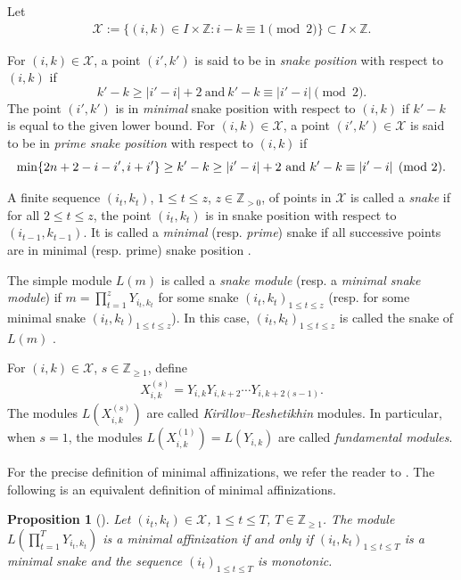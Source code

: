 \documentclass[11pt, reqno]{amsart}
\theoremstyle{plain}
\newtheorem{proposition}[theorem]{Proposition}
\theoremstyle{definition}
\numberwithin{equation}{section}
\newcommand{\ZZ}{{\mathbb {Z}}}
\begin{document}
Let
\begin{align}\label{Eq:X}
\mathcal{X}:=\{(i,k)\in I \times \mathbb{Z}: i-k \equiv 1 \pmod 2\} \subset I \times \mathbb{Z}.
\end{align}

For $(i,k) \in \mathcal{X}$, a point $(i',k')$ is said to be in \textit{snake position} with respect to $(i,k)$ if
\[
k'-k \geq |i'-i|+2 \ \text{and} \  k'-k \equiv |i'-i|\pmod 2.
\]
The point $(i',k')$ is in \textit{minimal} snake position with respect to $(i,k)$ if $k'-k$ is equal to the given lower bound. 
For $(i,k) \in \mathcal{X}$, a point $(i',k') \in \mathcal{X}$ is said to be in \textit{prime snake position} with respect to $(i,k)$ if
\[
\min \{ 2n+2-i-i', i+i' \} \geq k'-k \geq |i'-i|+2 \ \text{and} \  k'-k \equiv |i'-i| \pmod 2.  \\
\]

A finite sequence $(i_{t},k_{t})$, $1 \leq t \leq z$, $z \in \mathbb{Z}_{>0}$, of points in $\mathcal{X}$ is called a \textit{snake} if for all $2 \leq t \leq z$, the point $(i_{t},k_{t})$ is in snake position with respect to $(i_{t-1},k_{t-1})$. It is called a \textit{minimal} (resp. \textit{prime}) snake if all successive points are in minimal (resp. prime) snake position \cite[Section 4]{MY12}.

The simple module $L(m)$ is called a \textit{snake module} (resp. a \textit{minimal snake module}) if $m=\prod_{t=1}^{z} Y_{i_{t},k_{t}}$ for some snake $(i_{t},k_{t})_{1 \leq t \leq z}$ (resp. for some minimal snake $(i_{t},k_{t})_{1 \leq t \leq z}$). In this case, $(i_{t},k_{t})_{1 \leq t \leq z}$ is called the snake of $L(m)$ \cite[Section 4]{MY12}.

For $(i,k)\in \mathcal{X}$, $s\in\ZZ_{\geq 1}$, define
\begin{align}\label{Eq:KR module}
X_{i,k}^{(s)}=Y_{i,k}Y_{i,k+2}\cdots Y_{i,k+2(s-1)}.
\end{align}
The modules $L(X_{i,k}^{(s)})$ are called \textit{Kirillov--Reshetikhin} modules. In particular, when $s=1$, the modules $L(X_{i,k}^{(1)})=L(Y_{i,k})$ are called \textit{fundamental modules}.

For the precise definition of minimal affinizations, we refer the reader to \cite{C95, CP96}. The following is an equivalent definition of minimal affinizations.
\begin{proposition}[{\cite[Proposition 4.2]{MY12}}]\label{Prop:minimal affine module}
Let $(i_t,k_t) \in \mathcal{X}$, $1\leq t\leq T$, $T\in\ZZ_{\geq 1}$. The module $L(\prod^T_{t=1}Y_{i_t,k_t})$ is a minimal affinization if and only if $(i_t,k_t)_{1\leq t\leq T}$ is a minimal snake and the sequence $(i_t)_{1\leq t\leq T}$ is monotonic.
\end{proposition}
\end{document}
